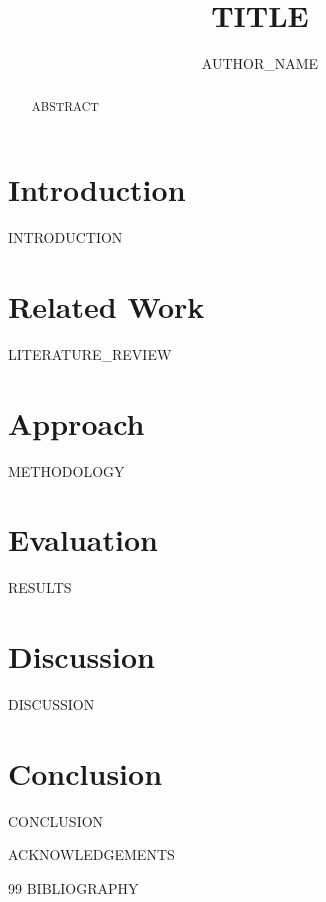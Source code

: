 \documentclass[sigconf,nonacm]{acmart}
\begin{document}
\title{{{TITLE}}}

\author{{{AUTHOR_NAME}}}

\begin{abstract}
{{ABSTRACT}}
\end{abstract}


\maketitle

\section{Introduction}
{{INTRODUCTION}}

\section{Related Work}
{{LITERATURE_REVIEW}}

\section{Approach}
{{METHODOLOGY}}

\section{Evaluation}
{{RESULTS}}

\section{Discussion}
{{DISCUSSION}}

\section{Conclusion}
{{CONCLUSION}}

\begin{acks}
{{ACKNOWLEDGEMENTS}}
\end{acks}


\begin{thebibliography}{99}
{{BIBLIOGRAPHY}}
\end{thebibliography}
\end{document}
